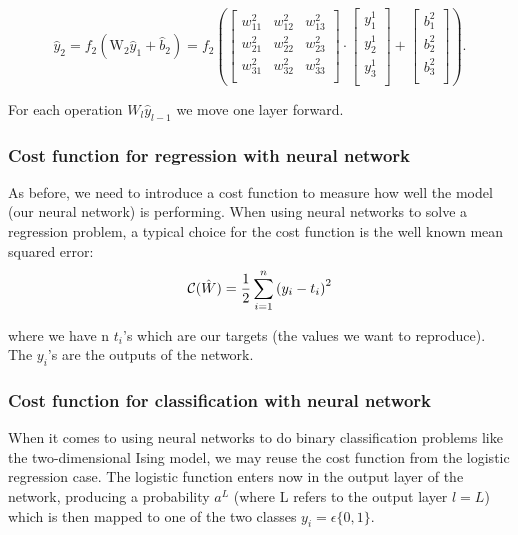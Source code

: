 \documentclass[a4paper,12pt]{article}
\begin{document}
\begin{equation}
 \hat{y}_2 = f_2(\mathrm{W}_2 \hat{y}_{1} + \hat{b}_{2}) = 
 f_2\left(\left[\begin{array}{ccc}
    w^2_{11} &w^2_{12} &w^2_{13} \\
    w^2_{21} &w^2_{22} &w^2_{23} \\
    w^2_{31} &w^2_{32} &w^2_{33} \\
    \end{array} \right] \cdot
    \left[\begin{array}{c}
           y^1_1 \\
           y^1_2 \\
           y^1_3 \\
          \end{array}\right] + 
    \left[\begin{array}{c}
           b^2_1 \\
           b^2_2 \\
           b^2_3 \\
          \end{array}\right]\right).
\end{equation}

For each operation $W_l \hat{y}_{l-1}$ we move one layer forward.

\subsubsection{Cost function for regression with neural network}
As before, we need to introduce a cost function to measure how well the model (our neural network) is performing.\newline
When using neural networks to solve a regression problem, a typical choice for the cost function is the well known mean squared error:
\begin{equation}
   {\cal C}(\hat{W})  =  \frac{1}{2}\sum_{i=1}^n\left(y_i - t_i\right)^2 
\end{equation}

where we have n $t_i$'s which are our targets (the values we want to reproduce). The $y_i$'s are the outputs of the network.

\subsubsection{Cost function for classification with neural network}
When it comes to using neural networks to do binary classification problems like the two-dimensional Ising model, we may reuse the cost function from the logistic regression case. The logistic function enters now in the output layer of the network, producing a probability $a^L$ (where L refers to the output layer $l=L$) which is then mapped to one of the two classes $y_i = \epsilon \{0, 1\}$.\newline
\end{document}

